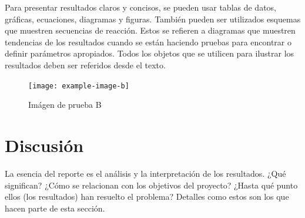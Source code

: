 \documentclass{article}
\begin{document}
\begin{multicols}{3}
Para presentar resultados claros y concisos, se pueden usar tablas de datos, gráficas, ecuaciones, diagramas y figuras. También pueden ser utilizados esquemas que muestren secuencias de reacción. Estos se refieren a diagramas que muestren tendencias de los resultados cuando se están haciendo pruebas para encontrar o definir parámetros apropiados. Todos los objetos que se utilicen para ilustrar los resultados deben ser referidos desde el texto.
\begin{figure}[H]
    \vspace{5mm}
    \centering
    \texttt{[image: example-image-b]}
    \caption{Imágen de prueba B}
\end{figure}

\section*{Discusión}

\noindent La esencia del reporte es el análisis y la interpretación de los resultados. ¿Qué significan? ¿Cómo se relacionan con los objetivos del proyecto? ¿Hasta qué punto ellos (los resultados) han resuelto el problema? Detalles como estos son los que hacen parte de esta sección.
%


\renewcommand{\bibfont}{\fontsize{30}{36}\selectfont}
\nocite{*}
\printbibliography



\end{multicols}
\end{document}
